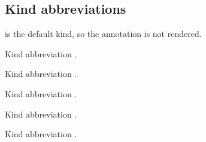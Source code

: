 \subsection{Kind abbreviations\label{Oxcaml--kind-abbreviations}}%
\label{Oxcaml--type-t_value}\begin{ocamlindent} is the default kind, so the annotation is not rendered.\end{ocamlindent}%
\medbreak
\label{Oxcaml--type-t_immediate}\begin{ocamlindent}Kind abbreviation .\end{ocamlindent}%
\medbreak
\label{Oxcaml--type-t_immediate64}\begin{ocamlindent}Kind abbreviation .\end{ocamlindent}%
\medbreak
\label{Oxcaml--type-t_immutable_data}\begin{ocamlindent}Kind abbreviation .\end{ocamlindent}%
\medbreak
\label{Oxcaml--type-t_sync_data}\begin{ocamlindent}Kind abbreviation .\end{ocamlindent}%
\medbreak
\label{Oxcaml--type-t_mutable_data}\begin{ocamlindent}Kind abbreviation .\end{ocamlindent}%
\medbreak
